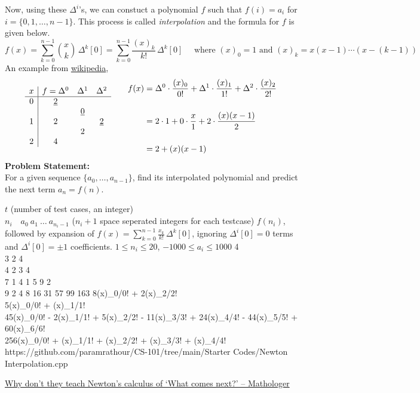 \documentclass[../../Problems]{subfiles}
\begin{document}
Now, using these $\Delta ^{i}$'s, we can constuct a polynomial $f$ such that $f(i)=a_i$ for $i=\{0,1,\ldots,n-1\}$. This process is called \emph{interpolation} and the formula for $f$ is given below.
\begin{equation}
	f(x)=\sum _{k=0}^{n-1}{\binom {x}{k}}\,\Delta ^{k}[0]=\sum _{k=0}^{n-1}\frac{(x)_k}{k!}\,\Delta ^{k}[0]%
	\quad\text{ where $(x)_0 = 1$ and $(x)_k=x(x-1)\cdots(x-(k-1))$}
\end{equation}
An example from \href{https://en.wikipedia.org/wiki/Finite_difference#Newton's_series}{wikipedia},
\vspace{-1em}\begin{equation}
	{{
	\begin{matrix}{
	\begin{array}{c|ccc} x&f=\Delta ^{0}&\Delta ^{1}&\Delta ^{2}\\\hline 0&{\underline {2}}&&\\
	&&{\underline {0}}&\\
	1&2&&{\underline {2}}\\
	&&2&\\
	2&4&&
	\end{array}}
	&\quad {
	\begin{aligned}
	f(x)&=\Delta ^{0}\cdot {\dfrac {(x)_{0}}{0!}}+\Delta ^{1}\cdot {\dfrac {(x)_{1}}{1!}}+\Delta ^{2}\cdot {\dfrac {(x)_{2}}{2!}}\quad\\\\
	&=2\cdot 1+0\cdot {\dfrac {x}{1}}+2\cdot {\dfrac {(x)(x-1)}{2}}\\\\
	&=2+(x)(x-1)
	\end{aligned}}\end{matrix}}}\vspace{-0.5em}
\end{equation}
\textbf{Problem Statement:}\\
For a given sequence $\{a_0,\ldots,a_{n-1}\}$, find its interpolated polynomial and predict the next term $a_{n}=f(n)$.
\begin{testcases}
	{$t$ \hfill(number of test cases, an integer)\\$n_i\quad a_{0}\ a_1\ \ldots\ a_{n_i-1}$ \hfill($n_i+1$ space seperated integers for each testcase)}
	{$f(n_i)$, followed by expansion of $f(x)=\displaystyle\sum _{k=0}^{n-1}\frac{x_k}{k!}\,\Delta ^{k}[0]$, ignoring $\Delta ^{i}[0]=0$ terms and $\Delta ^{i}[0]=\pm1$ coefficients.}
	{$1 \leq n_i \leq 20$, $-1000 \leq a_i \leq 1000$}
	{4\\3 2 4\\4 2 3 4\\7 1 4 1 5 9 2\\9 2 4 8 16 31 57 99 163}
	{8(x)\_{0}/0! + 2(x)\_{2}/2!\\5\quad(x)\_{0}/0! + (x)\_{1}/1!\\45(x)\_{0}/0! - 2(x)\_{1}/1! + 5(x)\_{2}/2! - 11(x)\_{3}/3! + 24(x)\_{4}/4! - 44(x)\_{5}/5! + 60(x)\_{6}/6!\\256\quad(x)\_{0}/0! + (x)\_{1}/1! + (x)\_{2}/2! + (x)\_{3}/3! + (x)\_{4}/4!}
	{https://github.com/paramrathour/CS-101/tree/main/Starter Codes/Newton Interpolation.cpp}
\end{testcases}
\begin{funvideo}
	\href{https://youtu.be/4AuV93LOPcE}{Why don't they teach Newton's calculus of `What comes next?' -- Mathologer}
\end{funvideo}
\end{document}

